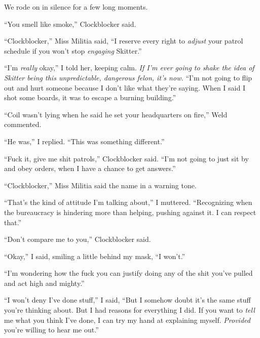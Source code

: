 We rode on in silence for a few long moments.



``You smell like smoke,'' Clockblocker said.



``Clockblocker,'' Miss Militia said, ``I reserve every right to \emph{adjust} your patrol schedule if you won't stop \emph{engaging} Skitter.''



``I'm \emph{really} okay,'' I told her, keeping calm.  \emph{If I'm ever going to shake the idea of Skitter being this unpredictable, dangerous felon, it's now.  }``I'm not going to flip out and hurt someone because I don't like what they're saying.  When I said I shot some boards, it was to escape a burning building.''



``Coil wasn't lying when he said he set your headquarters on fire,'' Weld commented.



``He was,'' I replied.  ``This was something different.''



``Fuck it, give me shit patrols,'' Clockblocker said.  ``I'm not going to just sit by and obey orders, when I have a chance to get answers.''



``Clockblocker,'' Miss Militia said the name in a warning tone.



``That's the kind of attitude I'm talking about,'' I muttered.  ``Recognizing when the bureaucracy is hindering more than helping, pushing against it.  I can respect that.''



``Don't compare me to you,'' Clockblocker said.



``Okay,'' I said, smiling a little behind my mask, ``I won't.''



``I'm wondering how the fuck you can justify doing any of the shit you've pulled and act high and mighty.''



``I won't deny I've done stuff,'' I said, ``But I somehow doubt it's the same stuff you're thinking about.  But I had reasons for everything I did.  If you want to \emph{tell} me what you think I've done, I can try my hand at explaining myself.  \emph{Provided} you're willing to hear me out.''



